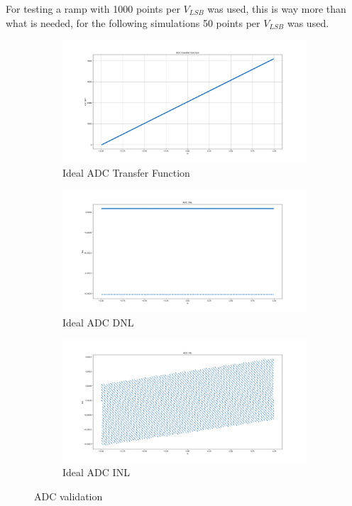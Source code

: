 For testing a ramp with 1000 points per $V_{LSB}$ was used, this is way more than what is needed, for the following simulations 50 points per $V_{LSB}$ was used.


\begin{figure}[H]
    \centering

    \begin{subfigure}[b]{0.9\textwidth}
        \centering
        \includegraphics[width=\textwidth]{Images/ADC_TransFunc_Ideal.png}
        \caption{Ideal ADC Transfer Function}
        \label{fig:ADC_TF_Ideal}
    \end{subfigure}%

    \begin{subfigure}[b]{0.5\textwidth}
        \centering
        \includegraphics[width=\textwidth]{Images/DNL_Ideal.png}
        \caption{Ideal ADC DNL}
        \label{fig:ADC_DNL_Ideal}
    \end{subfigure}%
    \begin{subfigure}[b]{0.5\textwidth}
        \centering
        \includegraphics[width=\textwidth]{Images/INL_Ideal.png}
        \caption{Ideal ADC INL}
        \label{fig:ADC_INL_Ideal}
    \end{subfigure}

    \caption{ADC validation}
    \label{fig:IdealADC}
\end{figure}

